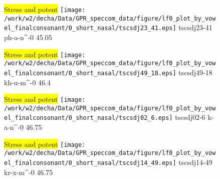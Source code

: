 \documentclass{article}
\begin{document}
\begin{figure}[t]
\begin{minipage}[b]{.24\textwidth}
\colorbox{yellow}{Stress and potent}
\centering
\texttt{[image: /work/w2/decha/Data/GPR\_speccom\_data/figure/lf0\_plot\_by\_vowel\_finalconsonant/0\_short\_nasal/tscsdj23\_41.eps]}
tscsdj23-41 ph-a-n\textasciicircum-0 45.05
\end{minipage}
\begin{minipage}[b]{.24\textwidth}
\colorbox{yellow}{Stress and potent}
\centering
\texttt{[image: /work/w2/decha/Data/GPR\_speccom\_data/figure/lf0\_plot\_by\_vowel\_finalconsonant/0\_short\_nasal/tscsdj49\_18.eps]}
tscsdj49-18 kh-u-m\textasciicircum-0 46.4
\end{minipage}
\begin{minipage}[b]{.24\textwidth}
\colorbox{yellow}{Stress and potent}
\centering
\texttt{[image: /work/w2/decha/Data/GPR\_speccom\_data/figure/lf0\_plot\_by\_vowel\_finalconsonant/0\_short\_nasal/tscsdj02\_6.eps]}
tscsdj02-6 k-a-n\textasciicircum-0 46.75
\end{minipage}
\begin{minipage}[b]{.24\textwidth}
\colorbox{yellow}{Stress and potent}
\centering
\texttt{[image: /work/w2/decha/Data/GPR\_speccom\_data/figure/lf0\_plot\_by\_vowel\_finalconsonant/0\_short\_nasal/tscsdj14\_49.eps]}
tscsdj14-49 kr-x-m\textasciicircum-0 46.75
\end{minipage}
\end{figure}
\end{document}
